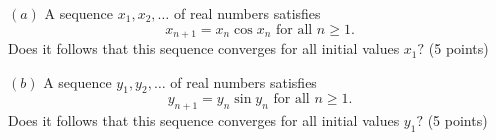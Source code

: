 
\begin{itemize}
\end{itemize}
$(a)$ A sequence $x_1,x_2,\dots$ of real numbers satisfies
\[x_{n+1}=x_n \cos x_n \textrm{ for all } n\geq 1.\]
Does it follows that this sequence converges for all initial values $x_1?$  (5 points)

$(b)$ A sequence $y_1,y_2,\dots$ of real numbers satisfies
\[y_{n+1}=y_n \sin y_n \textrm{ for all } n\geq 1.\]
Does it follows that this sequence converges for all initial values $y_1?$ (5 points)